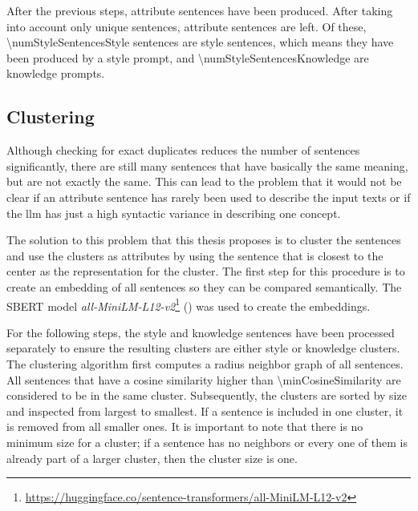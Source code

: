 After the previous steps, \numStyleSentencesNotUniqueText{} attribute sentences have been produced. After taking into account only unique sentences, \numStyleSentencesText{} attribute sentences are left. Of these, \num{\numStyleSentencesStyle} sentences are style sentences, which means they have been produced by a style prompt, and \num{\numStyleSentencesKnowledge} are knowledge prompts.
% 

\subsection{Clustering}
\label{sec:experiments:setup:clustering}
Although checking for exact duplicates reduces the number of sentences significantly, there are still many sentences that have basically the same meaning, but are not exactly the same. This can lead to the problem that it would not be clear if an attribute sentence has rarely been used to describe the input texts or if the \ac{llm} has just a high syntactic variance in describing one concept.

The solution to this problem that this thesis proposes is to cluster the sentences and use the clusters as attributes by using the sentence that is closest to the center as the representation for the cluster.
The first step for this procedure is to create an embedding of all sentences so they can be compared semantically. The SBERT model \textit{all-MiniLM-L12-v2}\footnote{\url{https://huggingface.co/sentence-transformers/all-MiniLM-L12-v2}} (\cite{reimersSentenceBERTSentenceEmbeddings2019}) was used to create the embeddings.

For the following steps, the style and knowledge sentences have been processed separately to ensure the resulting clusters are either style or knowledge clusters.
The clustering algorithm first computes a radius neighbor graph of all sentences. All sentences that have a cosine similarity higher than \num{\minCosineSimilarity} are considered to be in the same cluster. Subsequently, the clusters are sorted by size and inspected from largest to smallest. If a sentence is included in one cluster, it is removed from all smaller ones. It is important to note that there is no minimum size for a cluster; if a sentence has no neighbors or every one of them is already part of a larger cluster, then the cluster size is one.


